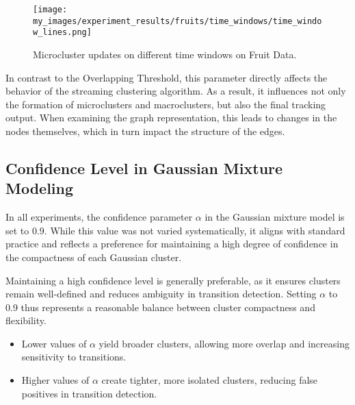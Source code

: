 \begin{figure}[H]
      \centering
      \texttt{[image: my\_images/experiment\_results/fruits/time\_windows/time\_window\_lines.png]}
      \caption{Microcluster updates on different time windows on Fruit Data.}
\end{figure}

In contrast to the Overlapping Threshold, this parameter directly affects the
behavior of the streaming clustering algorithm. As a result, it influences not
only the formation of microclusters and macroclusters, but also the final
tracking output. When examining the graph representation, this leads to changes
in the nodes themselves, which in turn impact the structure of the edges.

\subsection{Confidence Level in Gaussian Mixture Modeling}
In all experiments, the confidence parameter $\alpha$ in the Gaussian mixture
model is set to 0.9. While this value was not varied systematically, it aligns
with standard practice and reflects a preference for maintaining a high degree
of confidence in the compactness of each Gaussian cluster.

Maintaining a high confidence level is generally preferable, as it ensures
clusters remain well-defined and reduces ambiguity in transition detection.
Setting $\alpha$ to 0.9 thus represents a reasonable balance between cluster
compactness and flexibility.

\begin{itemize}
      \item Lower values of $\alpha$ yield broader clusters, allowing more overlap and
            increasing sensitivity to transitions.
      \item Higher values of $\alpha$ create tighter, more isolated clusters, reducing
            false positives in transition detection.
\end{itemize}
